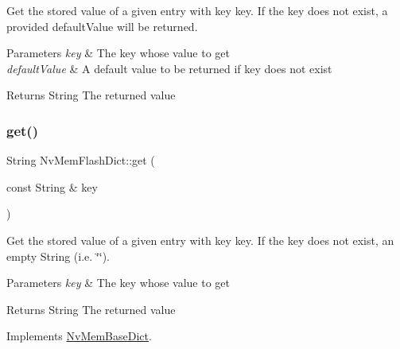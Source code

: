 Get the stored value of a given entry with key {\ttfamily key}. If the {\ttfamily key} does not exist, a provided {\ttfamily default\+Value} will be returned. 


\begin{DoxyParams}{Parameters}
{\em key} & The key whose value to get \\
\hline
{\em default\+Value} & A default value to be returned if {\ttfamily key} does not exist \\
\hline
\end{DoxyParams}
\begin{DoxyReturn}{Returns}
String The returned value 
\end{DoxyReturn}
\mbox{\label{class_nv_mem_flash_dict_a16eb803b23dc954a814ac2dc8580bd5e}} 
\subsubsection{\texorpdfstring{get()}{get()}\hspace{0.1cm}{\footnotesize\ttfamily [2/2]}}
{\footnotesize\ttfamily String Nv\+Mem\+Flash\+Dict\+::get (\begin{DoxyParamCaption}\item[{const String \&}]{key }\end{DoxyParamCaption})\hspace{0.3cm}{\ttfamily [virtual]}}



Get the stored value of a given entry with key {\ttfamily key}. If the {\ttfamily key} does not exist, an empty {\ttfamily String} (i.\+e. {\ttfamily \char`\"{}\char`\"{}}). 


\begin{DoxyParams}{Parameters}
{\em key} & The key whose value to get \\
\hline
\end{DoxyParams}
\begin{DoxyReturn}{Returns}
String The returned value 
\end{DoxyReturn}


Implements \mbox{\hyperlink{class_nv_mem_base_dict_a876f70d76462b15bfc23cab438077d17}{Nv\+Mem\+Base\+Dict}}.

\mbox{\label{class_nv_mem_flash_dict_a25030ea9f57f53339b5f550fc89361af}} 
